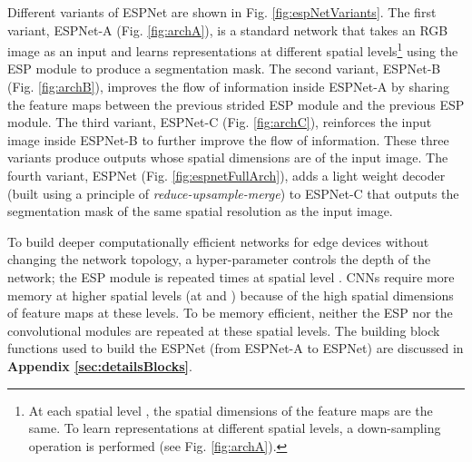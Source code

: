\documentclass[runningheads]{llncs}
\def\Fig{Fig. }
\begin{document}
Different variants of ESPNet are shown in \Fig \ref{fig:espNetVariants}. The first variant, ESPNet-A (\Fig \ref{fig:archA}), is a standard network that takes an RGB image as an input and learns representations at different spatial levels\footnote{At each spatial level , the spatial dimensions of the feature maps are the same. To learn representations at different spatial levels, a down-sampling operation is performed (see \Fig \ref{fig:archA}).} using the ESP module to produce a segmentation mask. The second variant, ESPNet-B (\Fig \ref{fig:archB}), improves the flow of information inside ESPNet-A by sharing the feature maps between the previous strided ESP module and the previous ESP module. The third variant, ESPNet-C (\Fig \ref{fig:archC}), reinforces the input image inside ESPNet-B to further improve the flow of information. These three variants produce outputs whose spatial dimensions are  of the input image. The fourth variant, ESPNet (\Fig \ref{fig:espnetFullArch}), adds a light weight decoder (built using a principle of \textit{reduce-upsample-merge}) to ESPNet-C that outputs the segmentation mask of the same spatial resolution as the input image. 

To build deeper computationally efficient networks for edge devices without changing the network topology,  a hyper-parameter   controls the depth of the network;  the ESP module is repeated  times at spatial level . CNNs require more memory at higher spatial levels (at  and ) because of the high spatial dimensions of feature maps at these levels. To be memory efficient, neither the ESP nor the convolutional modules are repeated at these spatial levels. The building block functions used to build the ESPNet (from ESPNet-A to ESPNet) are discussed in \textbf{Appendix \ref{sec:detailsBlocks}}. 
\end{document}
